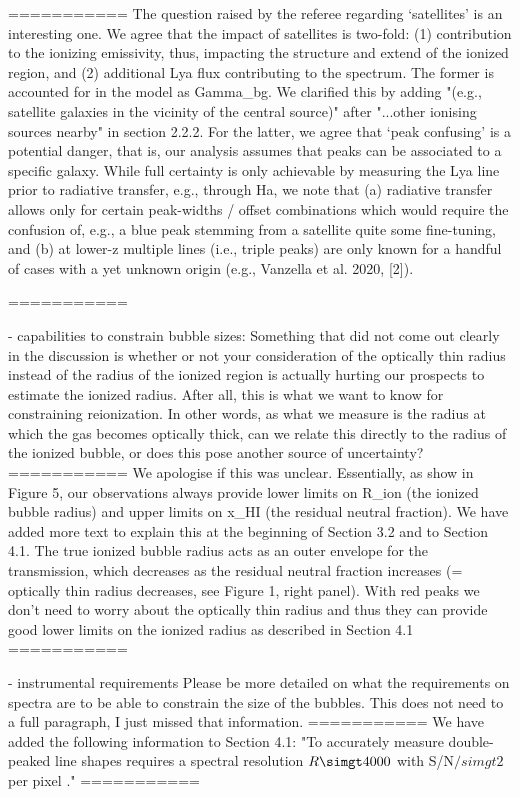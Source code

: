 ===========
The question raised by the referee regarding `satellites' is an interesting one. We agree that the impact of satellites is two-fold: (1) contribution to the ionizing emissivity, thus, impacting the structure and extend of the ionized region, and (2) additional Lya flux contributing to the spectrum.
The former is accounted for in the model as Gamma_bg. We clarified this by adding "(e.g., satellite galaxies in the vicinity of the central source)" after "...other ionising sources nearby" in section 2.2.2.
For the latter, we agree that `peak confusing' is a potential danger, that is, our analysis assumes that peaks can be associated to a specific galaxy. While full certainty is only achievable by measuring the Lya line prior to radiative transfer, e.g., through Ha, we note that (a) radiative transfer allows only for certain peak-widths / offset combinations which would require the confusion of, e.g., a blue peak stemming from a satellite quite some fine-tuning, and (b) at lower-z multiple lines (i.e., triple peaks) are only known for a handful of cases with a yet unknown origin (e.g., Vanzella et al. 2020, [2]).

===========

- capabilities to constrain bubble sizes:
Something that did not come out clearly in the discussion is whether or not your consideration of the optically thin radius instead of the radius of the ionized region is actually hurting our prospects to estimate the ionized radius. After all, this is what we want to know for constraining reionization. In other words, as what we measure is the radius at which the gas becomes optically thick, can we relate this directly to the radius of the ionized bubble, or does this pose another source of uncertainty?
===========
We apologise if this was unclear. Essentially, as show in Figure 5, our observations always provide lower limits on R_ion (the ionized bubble radius) and upper limits on x_HI (the residual neutral fraction). We have added more text to explain this at the beginning of Section 3.2 and to Section 4.1. The true ionized bubble radius acts as an outer envelope for the transmission, which decreases as the residual neutral fraction increases (= optically thin radius decreases, see Figure 1, right panel). With red peaks we don't need to worry about the optically thin radius and thus they can provide good lower limits on the ionized radius as described in Section 4.1
===========

- instrumental requirements
Please be more detailed on what the requirements on spectra are to be able to constrain the size of the bubbles. This does not need to a full paragraph, I just missed that information.
===========
We have added the following information to Section 4.1: "To accurately measure double-peaked \lya line shapes requires a spectral resolution $R\simgt4000$ with S/N$/simgt2$ per pixel \citep[e.g.,][]{Verhamme2015}."
===========

